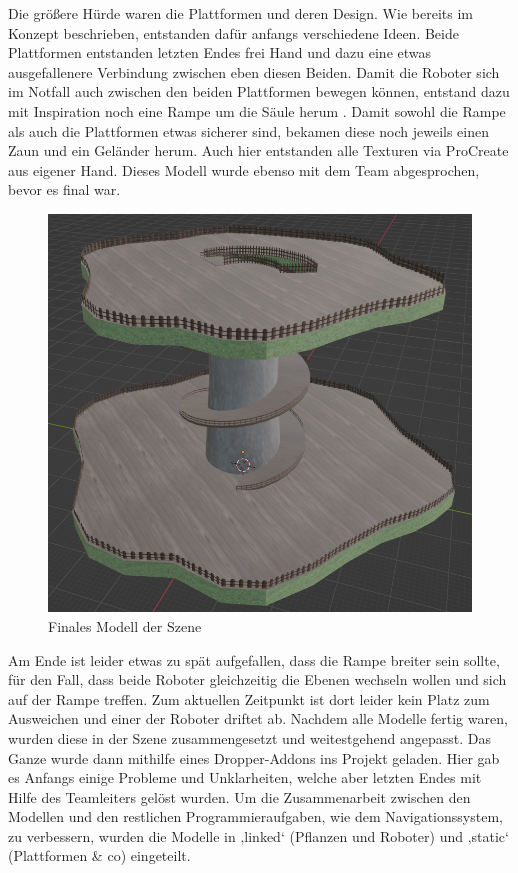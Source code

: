 \par
Die größere Hürde waren die Plattformen und deren Design. Wie bereits im Konzept beschrieben, entstanden dafür anfangs verschiedene Ideen. Beide Plattformen entstanden letzten Endes frei Hand und dazu eine etwas ausgefallenere Verbindung zwischen eben diesen Beiden. Damit die Roboter sich im Notfall auch zwischen den beiden Plattformen bewegen können, entstand dazu mit Inspiration noch eine Rampe um die Säule herum \cite{Spiral_Road}. Damit sowohl die Rampe als auch die Plattformen etwas sicherer sind, bekamen diese noch jeweils einen Zaun und ein Geländer herum. Auch hier entstanden alle Texturen via ProCreate aus eigener Hand. Dieses Modell wurde ebenso mit dem Team abgesprochen, bevor es final war. 
\begin{figure}[H]
	\centering
	\includegraphics[height=0.3\pageheight,keepaspectratio]{pics/13} 
	\caption{Finales Modell der Szene}
\end{figure}
\par
Am Ende ist leider etwas zu spät aufgefallen, dass die Rampe breiter sein sollte, für den Fall, dass beide Roboter gleichzeitig die Ebenen wechseln wollen und sich auf der Rampe treffen. Zum aktuellen Zeitpunkt ist dort leider kein Platz zum Ausweichen und einer der Roboter driftet ab.
Nachdem alle Modelle fertig waren, wurden diese in der Szene zusammengesetzt und weitestgehend angepasst. Das Ganze wurde dann mithilfe eines Dropper-Addons ins Projekt geladen. Hier gab es Anfangs einige Probleme und Unklarheiten, welche aber letzten Endes mit Hilfe des Teamleiters gelöst wurden. Um die Zusammenarbeit zwischen den Modellen und den restlichen Programmieraufgaben, wie dem Navigationssystem, zu verbessern, wurden die Modelle in ‚linked‘ (Pflanzen und Roboter) und ‚static‘ (Plattformen \& co) eingeteilt.
